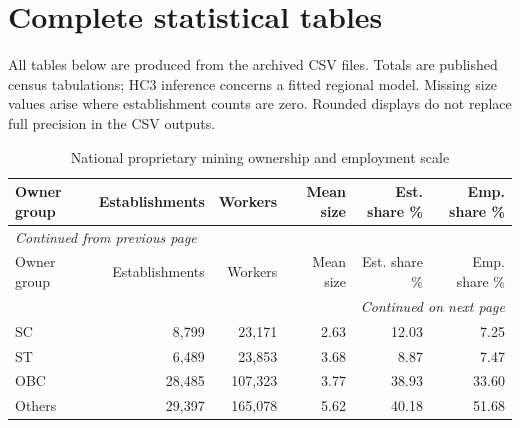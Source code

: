 \documentclass[11pt,a4paper]{report}
\begin{document}
\chapter{Complete statistical tables}
All tables below are produced from the archived CSV files. Totals are published census tabulations; HC3 inference concerns a fitted regional model. Missing size values arise where establishment counts are zero. Rounded displays do not replace full precision in the CSV outputs.
\begingroup\footnotesize\setlength{\tabcolsep}{4pt}
\begin{longtable}{lrrrrr}
\caption{National proprietary mining ownership and employment scale}\\\toprule
Owner group & Establishments & Workers & Mean size & Est. share \% & Emp. share \% \\\midrule\endfirsthead
\multicolumn{6}{l}{\textit{Continued from previous page}}\\\toprule
Owner group & Establishments & Workers & Mean size & Est. share \% & Emp. share \% \\\midrule\endhead
\midrule\multicolumn{6}{r}{\textit{Continued on next page}}\\\endfoot\bottomrule\endlastfoot
SC & 8,799 & 23,171 & 2.63 & 12.03 & 7.25 \\
ST & 6,489 & 23,853 & 3.68 & 8.87 & 7.47 \\
OBC & 28,485 & 107,323 & 3.77 & 38.93 & 33.60 \\
Others & 29,397 & 165,078 & 5.62 & 40.18 & 51.68 \\
\end{longtable}\endgroup
\begingroup\footnotesize\setlength{\tabcolsep}{4pt}
\end{document}

